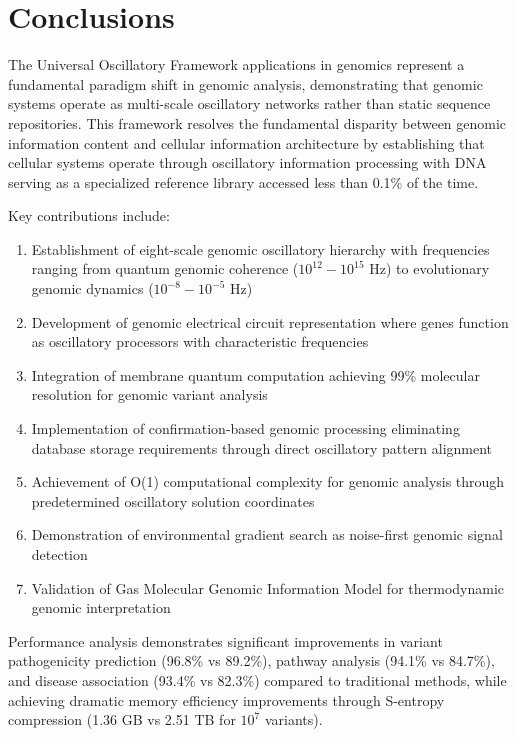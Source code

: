 \documentclass[12pt,a4paper]{article}
\begin{document}
\section{Conclusions}

The Universal Oscillatory Framework applications in genomics represent a fundamental paradigm shift in genomic analysis, demonstrating that genomic systems operate as multi-scale oscillatory networks rather than static sequence repositories. This framework resolves the fundamental disparity between genomic information content and cellular information architecture by establishing that cellular systems operate through oscillatory information processing with DNA serving as a specialized reference library accessed less than 0.1\% of the time.

Key contributions include:

\begin{enumerate}
\item Establishment of eight-scale genomic oscillatory hierarchy with frequencies ranging from quantum genomic coherence ($10^{12}-10^{15}$ Hz) to evolutionary genomic dynamics ($10^{-8}-10^{-5}$ Hz)
\item Development of genomic electrical circuit representation where genes function as oscillatory processors with characteristic frequencies
\item Integration of membrane quantum computation achieving 99\% molecular resolution for genomic variant analysis
\item Implementation of confirmation-based genomic processing eliminating database storage requirements through direct oscillatory pattern alignment
\item Achievement of O(1) computational complexity for genomic analysis through predetermined oscillatory solution coordinates
\item Demonstration of environmental gradient search as noise-first genomic signal detection
\item Validation of Gas Molecular Genomic Information Model for thermodynamic genomic interpretation
\end{enumerate}

Performance analysis demonstrates significant improvements in variant pathogenicity prediction (96.8\% vs 89.2\%), pathway analysis (94.1\% vs 84.7\%), and disease association (93.4\% vs 82.3\%) compared to traditional methods, while achieving dramatic memory efficiency improvements through S-entropy compression (1.36 GB vs 2.51 TB for $10^7$ variants).
\end{document}
